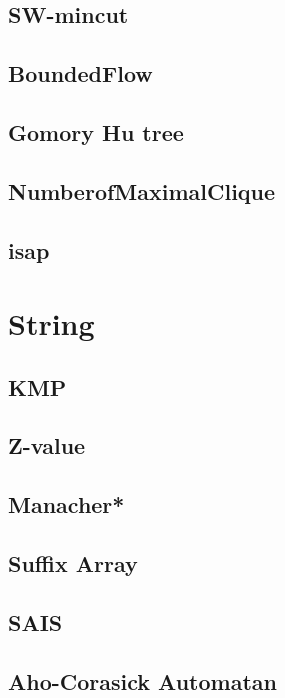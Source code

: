 \subsection{SW-mincut}

\subsection{BoundedFlow}

\subsection{Gomory Hu tree}

\subsection{NumberofMaximalClique}

\subsection{isap}



\section{String}
\subsection{KMP}

\subsection{Z-value}

\subsection{Manacher*} %

\subsection{Suffix Array}

\subsection{SAIS}

\subsection{Aho-Corasick Automatan}

